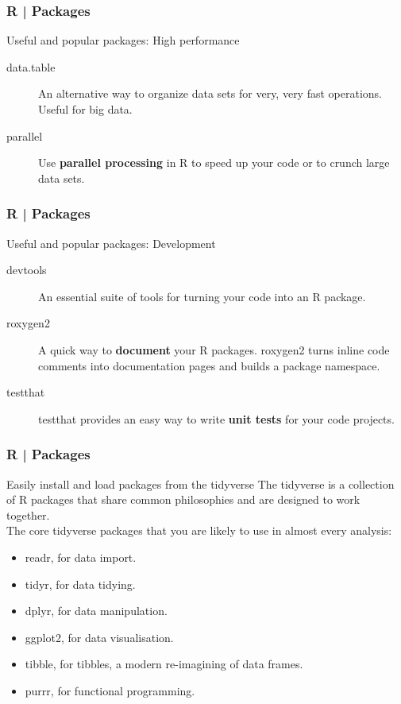 \begin{frame}
  \frametitle{R | Packages}
  \begin{block}{Useful and popular packages: High performance}
    \begin{description}
      \item[\alert{data.table}] An alternative way to organize data sets for \alert{very, very fast} operations. Useful for big data.
      \item[parallel] Use \textbf{parallel processing} in R to speed up your code or to crunch large data sets.
    \end{description}
  \end{block}
\end{frame}

\begin{frame}
  \frametitle{R | Packages}
  \begin{block}{Useful and popular packages: Development}
    \begin{description}
      \item[devtools] An essential suite of tools for turning your code into an R package.
      \item[roxygen2] A quick way to \textbf{document} your R packages. roxygen2 turns inline code comments into documentation pages and builds a package namespace.
      \item[testthat] testthat provides an easy way to write \textbf{unit tests} for your code projects.
    \end{description}
  \end{block}
\end{frame}

\begin{frame}
  \frametitle{R | Packages}
  \begin{block}{Easily install and load packages from the tidyverse}
    The \alert{tidyverse} is a collection of R packages that share common philosophies and are designed to work together.\\
    The \alert{core tidyverse packages} that you are likely to use in almost every analysis:
    \begin{itemize}
      \item readr, for data import.
      \item tidyr, for data tidying.
      \item dplyr, for data manipulation.
      \item ggplot2, for data visualisation.
      \item tibble, for tibbles, a modern re-imagining of data frames.
      \item purrr, for functional programming.
    \end{itemize}
  \end{block}
\end{frame}

